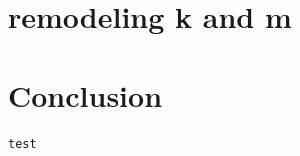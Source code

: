 \documentclass{book}
\renewcommand{\(}{\left(}
\renewcommand{\)}{\right)}
\begin{document}
\chapter{remodeling k and m}
\chapter{Conclusion}


\lstset{style=codejupytr}

\begin{lstlisting}
test
\end{lstlisting}


\appendix



%
\lstset{style=codepy}


%
%
\end{document}
